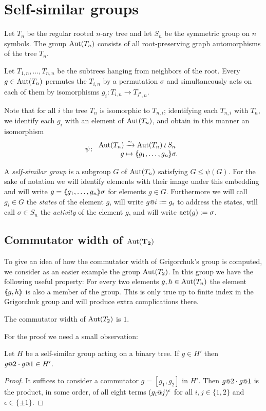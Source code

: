 \documentclass[a4paper,11pt]{amsart}
\begin{document}
\section{Self-similar groups}\label{sec:SelfSimilarGroups}
Let $T_n$ be the regular rooted $n$-ary tree and let $S_n$ be the symmetric group on $n$ symbols.
The group $\operatorname{{Aut}}(T_n)$ consists of all root-preserving graph automorphisms of the tree $T_n$. 

Let $T_{1,n},\dotsc,T_{n,n}$ be the subtrees hanging from neighbors of the root. 
Every $g\in\operatorname{{Aut}}(T_n)$ permutes the $T_{i,n}$ by a permutation $\sigma$ and simultaneously
acts on each of them by isomorphisms $g_i\colon T_{i,n}\to T_{i^\sigma,n}$.

Note that for all $i$ the tree $T_n$ is isomorphic to $T_{n,i}$; identifying each $T_{n,i}$ with $T_n$, 
we identify each $g_i$ with an element of $\operatorname{{Aut}}(T_n)$, and obtain in this manner an isomorphism
\[\psi\colon\begin{array}{r@{\;}l}
              \Aut(T_n) &\xrightarrow{\sim} \Aut(T_n)\wr S_n\\
              g &\mapsto \pair{g_1,\dotsc,g_n}\sigma.
            \end{array}
\]

A \emph{self-similar group} is a subgroup $G$ of $\operatorname{{Aut}}(T_n)$
satisfying $G\leq \psi(G)$.  For the sake of notation we will identify
elements with their image under this embedding and will write
$g=\langle\negthickspace\langle g_1,\dotsc,g_n\rangle\negthickspace\rangle\sigma$ for elements $g\in G$.  Furthermore we
will call $g_i\in G$ the \emph{states} of the element $g$, will write
$g\at{i}:=g_i$ to address the states, will call $\sigma \in S_n$ the
\emph{activity} of the element $g$, and will write $\operatorname{act}(g):= \sigma$.

\subsection{Commutator width of \texorpdfstring{$\mathbf{\textup{Aut}(T_2)}$}{Aut(T2)} }
To give an idea of how the commutator width of Grigorchuk's group is
computed, we consider as an easier example the group $\operatorname{{Aut}}(T_2)$. In
this group we have the following useful property: For every two
elements $g,h\in \operatorname{{Aut}}(T_n)$ the element $\langle\negthickspace\langle g,h\rangle\negthickspace\rangle$ is also a member
of the group.  This is only true up to finite index in the Grigorchuk
group and will produce extra complications there.

\begin{pro}\label{pro:comwidthAutT2}
 The commutator width of $\operatorname{{Aut}}(T_2)$ is $1$.
\end{pro}
For the proof we need a small observation:
\begin{lem}\label{lem:H'}
  Let $H$ be a self-similar group acting on a binary tree.
  If $g\in H'$ then $g\at{2}\cdot g\at{1}\in H'$. 
\end{lem}
\begin{proof}
  It suffices to consider a commutator $g=[g_1,g_2]$ in $H'$. Then
  $g\at 2\cdot g\at 1$ is the product, in some order, of all eight
  terms $(g_i\at j)^\epsilon$ for all $i,j\in\{1,2\}$ and
  $\epsilon\in\{\pm1\}$.
\end{proof}
\end{document}
